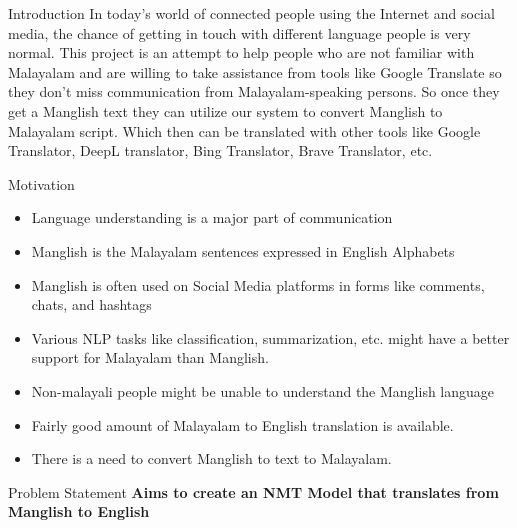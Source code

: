 \begin{chapter}{Introduction}
    \thispagestyle{empty}
    In today's world of connected people using the Internet and social media, the chance of getting in touch with different language people is very normal. This project is an attempt to help people who are not familiar with Malayalam and are willing to take assistance from tools like Google Translate so they don't miss communication from Malayalam-speaking persons. So once they get a Manglish text they can utilize our system to convert Manglish to Malayalam script. Which then can be translated with other tools like Google Translator, DeepL translator, Bing Translator, Brave Translator, etc. 
    
    \begin{section}{Motivation}
        \begin{itemize}
  \item Language understanding is a major part of communication
  \item Manglish is the Malayalam sentences expressed in English
Alphabets
  \item Manglish is often used on Social Media platforms in forms like
comments, chats, and hashtags
  \item Various NLP tasks like classification, summarization, etc. might have a
better support for Malayalam than Manglish.
  \item Non-malayali people might be unable to understand the Manglish
language
  \item Fairly good amount of Malayalam to English translation is available.
  \item There is a need to convert Manglish to text to Malayalam.
\end{itemize}
    \end{section}

    \begin{section}{Problem Statement}
        \textbf{Aims to create an NMT Model that translates from
Manglish to English}


\end{section}
\end{chapter}
